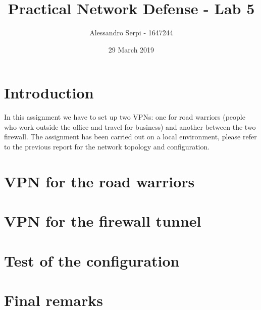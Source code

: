 \documentclass{homework}
\title{Practical Network Defense - Lab 5}
\author{Alessandro Serpi - 1647244}
\date{29 March 2019}
\begin{document}
    \maketitle
    \tableofcontents
    
    
    \pagebreak
    \section{Introduction}
    In this assignment we have to set up two VPNs: one for road warriors (people who work outside the office and travel for business) and another between the two firewall.
    The assignment has been carried out on a local environment, please refer to the previous report for the network topology and configuration.
    
    \section{VPN for the road warriors}
    
    \section{VPN for the firewall tunnel}
    
    \section{Test of the configuration}
    
    \section{Final remarks}
\end{document}
